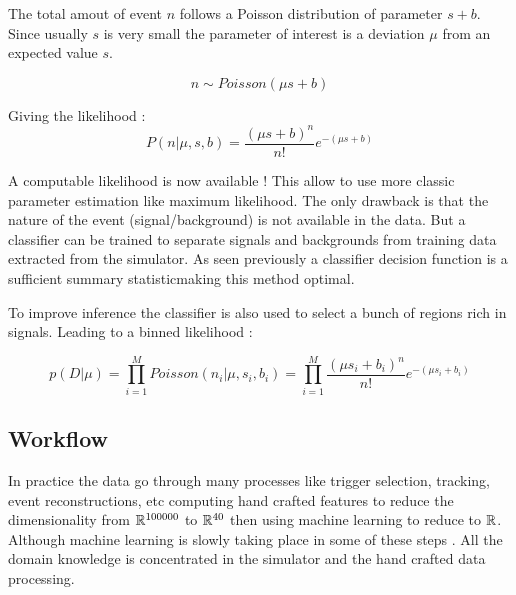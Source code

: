 The total amout of event $n$ follows a Poisson distribution of parameter $s + b$.
Since usually $s$ is very small the parameter of interest is a deviation $\mu$ from an expected value $s$.

\begin{equation}
	n \sim Poisson(\mu s + b)
\end{equation}

Giving the likelihood :
\begin{equation}
	P(n| \mu, s, b) = \frac{(\mu s +b)^n }{n!} e^{-(\mu s + b)}
\end{equation}

A computable likelihood is now available !
This allow to use more classic parameter estimation like maximum likelihood.
The only drawback is that the nature of the event (signal/background) is not available in the data.
But a classifier can be trained to separate signals and backgrounds from training data extracted from the simulator.
As seen previously a classifier decision function is a sufficient summary statisticmaking this method optimal.

To improve inference the classifier is also used to select a bunch of regions rich in signals.
Leading to a binned likelihood :

\begin{equation}
	p(D|\mu) = \prod_{i=1}^M Poisson(n_i | \mu, s_i, b_i) = \prod_{i=1}^M \frac{(\mu s_i + b_i)^n }{n!} e^{-(\mu s_i + b_i)}
\end{equation}







\subsection{Workflow} %
\label{sub:workflow}


In practice the data go through many processes like trigger selection, tracking, event reconstructions, etc computing hand crafted features to reduce the dimensionality from $\mathbb{R}^{100 000}$ to $\mathbb{R}^{40}$ then using machine learning to reduce to $\mathbb{R}$.
Although machine learning is slowly taking place in some of these steps \needcite.
All the domain knowledge is concentrated in the simulator and the hand crafted data processing.


